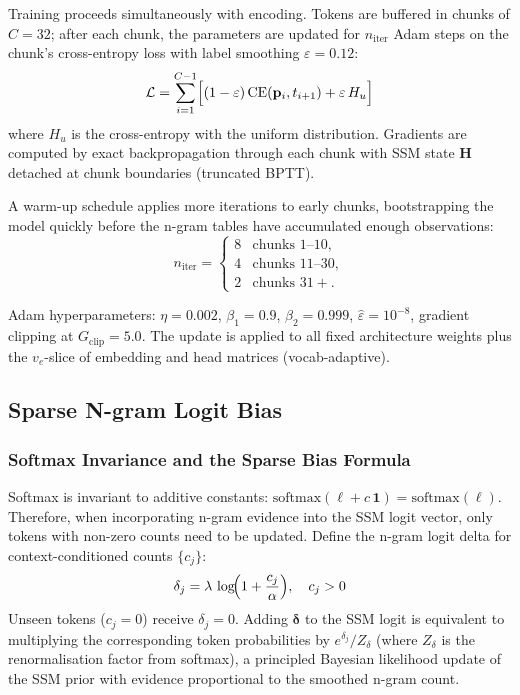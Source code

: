 \documentclass[10pt,twocolumn]{article}
\begin{document}
Training proceeds simultaneously with encoding.  Tokens are buffered
in chunks of $C=32$; after each chunk, the parameters are updated
for $n_\mathrm{iter}$ Adam steps on the chunk's cross-entropy loss
with label smoothing $\varepsilon=0.12$:
\begin{equation}
  \mathcal{L} = \sum_{i=1}^{C-1}
  \Bigl[(1-\varepsilon)\,\mathrm{CE}(\mathbf{p}_i, t_{i+1})
        + \varepsilon\,H_u\Bigr]
\end{equation}
where $H_u$ is the cross-entropy with the uniform distribution.
Gradients are computed by exact backpropagation through each chunk
with SSM state $\mathbf{H}$ detached at chunk boundaries (truncated BPTT).

A warm-up schedule applies more iterations to early chunks, bootstrapping
the model quickly before the n-gram tables have accumulated enough
observations:
\begin{equation}
n_\mathrm{iter} = \begin{cases}
  8 & \text{chunks } 1\text{--}10, \\
  4 & \text{chunks } 11\text{--}30, \\
  2 & \text{chunks } 31+.
\end{cases}
\end{equation}

Adam hyperparameters: $\eta=0.002$, $\beta_1=0.9$, $\beta_2=0.999$,
$\hat\varepsilon=10^{-8}$, gradient clipping at $G_\text{clip}=5.0$.
The update is applied to all fixed architecture weights plus the
$v_e$-slice of embedding and head matrices (vocab-adaptive).

\subsection{Sparse N-gram Logit Bias}
\label{sec:ngram}

\subsubsection{Softmax Invariance and the Sparse Bias Formula}

Softmax is invariant to additive constants:
$\mathrm{softmax}(\boldsymbol{\ell} + c\,\mathbf{1}) = \mathrm{softmax}(\boldsymbol{\ell})$.
Therefore, when incorporating n-gram evidence into the SSM logit vector,
only tokens with non-zero counts need to be updated.  Define the
n-gram logit delta for context-conditioned counts $\{c_j\}$:
\begin{equation}
  \delta_j = \lambda\,\log\!\Bigl(1 + \frac{c_j}{\alpha}\Bigr),
  \quad c_j > 0
  \label{eq:bias}
\end{equation}
Unseen tokens ($c_j=0$) receive $\delta_j=0$.  Adding $\boldsymbol{\delta}$
to the SSM logit is equivalent to multiplying the corresponding
token probabilities by $e^{\delta_j}/Z_\delta$ (where $Z_\delta$ is
the renormalisation factor from softmax), a principled Bayesian
likelihood update of the SSM prior with evidence proportional to the
smoothed n-gram count.
\end{document}
